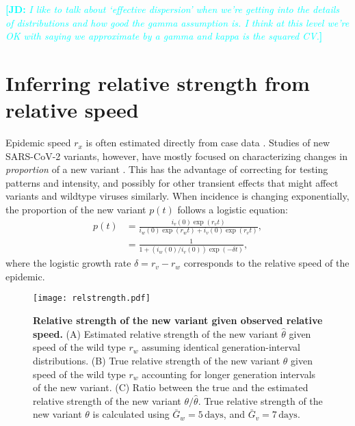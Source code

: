 \documentclass[12pt]{article}
\newcommand{\comment}{\showcomment}
\newcommand{\showcomment}[3]{\textcolor{#1}{\textbf{[#2: }\textsl{#3}\textbf{]}}}
\newcommand{\jd}[1]{\comment{cyan}{JD}{#1}}
\begin{document}
\jd{I like to talk about `effective dispersion' when we're getting into the details of distributions and how good the gamma assumption is. I think at this level we're OK with saying we approximate by a gamma and kappa is the squared CV.}

\section{Inferring relative strength from relative speed}

Epidemic speed $r_x$ is often estimated directly from case data \citep{mills2004transmissibility,nishiura2009transmission,ma2014estimating}.
Studies of new SARS-CoV-2 variants, however, have mostly focused on characterizing changes in \emph{proportion} of a new variant \citep{switzerland2021variant, davies2021estimated, di2021impact, leung2021early, volz2021transmission,zhao2021}.
This has the advantage of correcting for testing patterns and intensity, and possibly for other transient effects that might affect variants and wildtype viruses similarly.
When incidence is changing exponentially, the proportion of the new variant $p(t)$ follows a logistic equation:
\begin{align}
p(t) &= \frac{i_v(0) \exp(r_v t)}{i_w(0) \exp(r_w t) + i_v(0) \exp(r_v t)},
\\ &= \frac{1}{1 + \left(i_w(0)/i_v(0)\right) \exp(-\delta t)},
\end{align}
where the logistic growth rate $\delta = r_v - r_w$ corresponds to the relative speed of the epidemic.

\begin{figure}[!th]
\texttt{[image: relstrength.pdf]}
\caption{
\textbf{Relative strength of the new variant given observed relative speed.}
(A) Estimated relative strength of the new variant $\hat{\theta}$ given speed of the wild type
$r_w$ assuming identical generation-interval distributions.
(B) True relative strength of the new variant $\theta$ given speed of the wild type $r_w$ accounting for longer generation intervals of the new variant.
(C) Ratio between the true and the estimated relative strength of the new variant $\theta/\hat{\theta}$.
True relative strength of the new variant $\theta$ is calculated using $\bar{G}_w = 5\,\textrm{days}$, and $\bar{G}_v = 7\,\textrm{days}$.
}
\label{fig:relstrength}
\end{figure}
\end{document}

